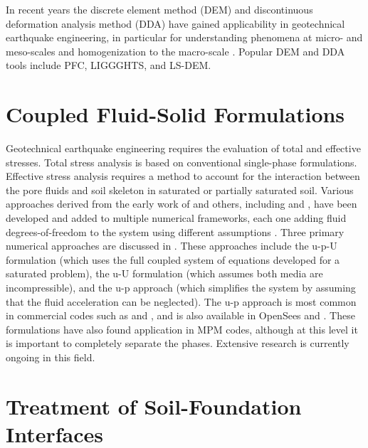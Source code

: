 In recent years the discrete element method (DEM) and discontinuous deformation analysis method (DDA) have gained applicability in geotechnical earthquake engineering, in particular for understanding phenomena at micro- and meso-scales and homogenization to the macro-scale \citep{kawamoto2018}. Popular DEM and DDA tools include PFC, LIGGGHTS, and LS-DEM.   

\section{Coupled Fluid-Solid Formulations}
\label{sec:resp_geotech_2}

Geotechnical earthquake engineering requires the evaluation of total and effective stresses. Total stress analysis is based on conventional single-phase formulations. Eﬀective stress analysis requires a method to account for the interaction between the pore ﬂuids and soil skeleton in saturated or partially saturated soil. Various approaches derived from the early work of \cite{Biot41, Biot56, Biot62} and others, including \cite{Borja06} and \cite{Ehlers02}, have been developed and added to multiple numerical frameworks, each one adding ﬂuid degrees-of-freedom to the system using diﬀerent assumptions \citep{Arduino01}. Three primary numerical approaches are discussed in \cite{Zienk84}. These approaches include the u-p-U formulation (which uses the full coupled system of equations developed for a saturated problem), the u-U formulation (which assumes both media are incompressible), and the u-p approach (which simpliﬁes the system by assuming that the ﬂuid acceleration can be neglected). The u-p approach is most common in commercial codes such as \citealt{PLAXIS} and \citealt{FLAC}, and is also available in OpenSees and \citealt{ESSI}. These formulations have also found application in MPM codes, although at this level it is important to completely separate the phases. Extensive research is currently ongoing in this field. 

\section{Treatment of Soil-Foundation Interfaces}
\label{sec:resp_geotech_3}

